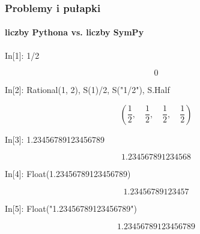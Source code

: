 \documentclass[10pt]{beamer}
\begin{document}
\begin{frame}[fragile]
  \frametitle{Problemy i pułapki}
  \framesubtitle{liczby Pythona vs. liczby SymPy}

  \begin{python}
    In[1]: 1/2
  \end{python}
  \begin{equation*}
    0
  \end{equation*}

  \begin{python}
    In[2]: Rational(1, 2), S(1)/2, S("1/2"), S.Half
  \end{python}
  \begin{equation*}
    \left ( \frac{1}{2}, \quad \frac{1}{2}, \quad \frac{1}{2}, \quad \frac{1}{2}\right )
  \end{equation*}

  \pause

  \begin{python}
    In[3]: 1.23456789123456789
  \end{python}
  \begin{equation*}
    1.234567891234568
  \end{equation*}

  \begin{python}
    In[4]: Float(1.23456789123456789)
  \end{python}
  \begin{equation*}
    1.23456789123457
  \end{equation*}

  \begin{python}
    In[5]: Float("1.23456789123456789")
  \end{python}
  \begin{equation*}
    1.23456789123456789
  \end{equation*}
\end{frame}
\end{document}
